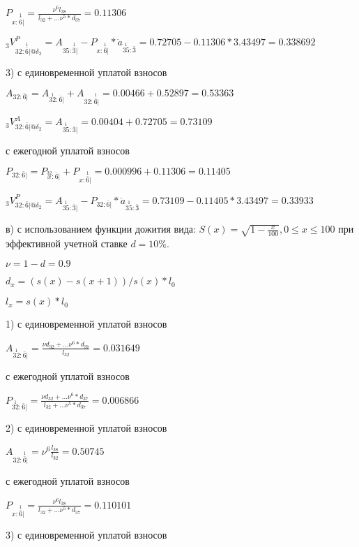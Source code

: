 \documentclass[12pt,a4paper, oneside]{extreport}
\begin{document}
$ P_{ x:  \overset{1}{\bar{6}}|} = \frac{\nu^6l_{38}}{l_{32} + ... \nu^5*d_{37}}= 0.11306$


$_3V_{  32:  \overset{1}{\bar{6}}|@\delta_2}^P = A_{35:  \overset{1}{\bar{3}}|} - P_{ x:  \overset{1}{\bar{6}}|}*\ddot{a}_{  \overset{1}{35} : \bar{3}} =   0.72705  -  0.11306 * 3.43497  = 0.338692$



3) с единовременной уплатой взносов 

$ A_{32: \bar{6}|} = A_{  \overset{1}{32} : \bar{6}|} + A_{32:  \overset{1}{\bar{6}}|} = 0.00466 + 0.52897 = 0.53363$


$_3V_{ 32: \bar{6}|@\delta_2}^A = A_{  \overset{1}{35} : \bar{3}|} =  0.00404 + 0.72705 =  0.73109$

с ежегодной уплатой взносов

$ P_{ 32:  \bar{6}| } = P_{ \overset{32}{x} : \bar{6}|} +  P_{ x:  \overset{1}{\bar{6}}|}  = 0.000996 + 0.11306 = 0.11405$


$_3V_{ 32: \bar{6}|@\delta_2}^P = A_{  \overset{1}{35} : \bar{3}|} - P_{ 32:  \bar{6}| } * \ddot{a}_{  \overset{1}{35} : \bar{3}} =  0.73109 -  0.11405 * 3.43497 = 0.33933 $




в) с использованием функции дожития вида:
$S(x) = \sqrt{1-\frac{x}{100}}, 0 \leq x \leq 100$ 
при эффективной учетной ставке $d=10\%$.

$\nu  = 1-d = 0.9$

$d_x = (s(x) - s(x+1))/ s(x) * l_0$

$l_x = s(x) * l_0$


1) с единовременной уплатой взносов

$ A_{  \overset{1}{32} : \bar{6}|} = \frac{\nu d_{32} + ... \nu^6*d_{37}}{l_{32}} = 0.031649$


с ежегодной уплатой взносов

$ P_{ \overset{1}{32} : \bar{6}|} = \frac{\nu d_{32} + ... \nu^6*d_{37}}{l_{32} + ... \nu^5*d_{37}} = 0.006866$



2) с единовременной уплатой взносов

$ A_{32:  \overset{1}{\bar{6}}|} = \nu^6 \frac{l_{38}}{l_{32}} = 0.50745$

с ежегодной уплатой взносов


$ P_{ x:  \overset{1}{\bar{6}}|} = \frac{\nu^6l_{38}}{l_{32} + ... \nu^5*d_{37}}= 0.110101$



3) с единовременной уплатой взносов 
\end{document}
